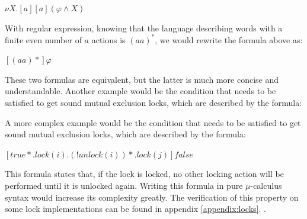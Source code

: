\documentclass[11pt]{article}
\theoremstyle{definition}
\theoremstyle{plain}
\let\temp\phi
\let\phi\varphi
\let\varphi\temp
\begin{document}
\begin{center}
	$ \nu X.[a][a](\phi\wedge X)$
\end{center}

With regular expression, knowing that the language describing words with a finite even number of $ a $ actions is $ (aa)^* $, we would rewrite the formula above as:

\begin{center}
	$ [(aa)*]\phi $
\end{center}

These two formulas are equivalent, but the latter is much more concise and understandable. Another example would be the condition that needs to be satisfied to get sound mutual exclusion locks, which are described by the formula:

A more complex example would be the condition that needs to be satisfied to get sound mutual exclusion locks, which are described by the formula:

\begin{center}
	$ [true*.lock(i).(!unlock(i))*.lock(j)]false $
\end{center}

This formula states that, if the lock is locked, no other locking action will be performed until it is unlocked again. Writing this formula in pure $ \mu $-calculus syntax would increase its complexity greatly. The verification of this property on some lock implementations can be found in appendix \ref{appendix:locks}. .
\end{document}
